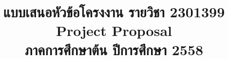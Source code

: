 \documentclass[a4paper,12pt]{article}
\title{แบบเสนอหัวข้อโครงงาน รายวิชา 2301399 \\ Project Proposal \\ ภาคการศึกษาต้น ปีการศึกษา 2558}
\begin{document}

\renewcommand{\refname}{รายการอ้างอิง}


\end{document}

